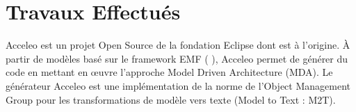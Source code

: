\chapter{Travaux Effectués}\label{chap:tra}
Acceleo est un projet Open Source de la fondation Eclipse dont \kwobeo{} est à l'origine. À partir de modèles basé sur le framework EMF (\cf{} \cite{emf}), Acceleo permet de générer du code en mettant en œuvre l'approche Model Driven Architecture (MDA). Le générateur Acceleo est une implémentation de la norme de l'Object Management Group \cite{omg} pour les transformations de modèle vers texte (Model to Text : M2T).

 








